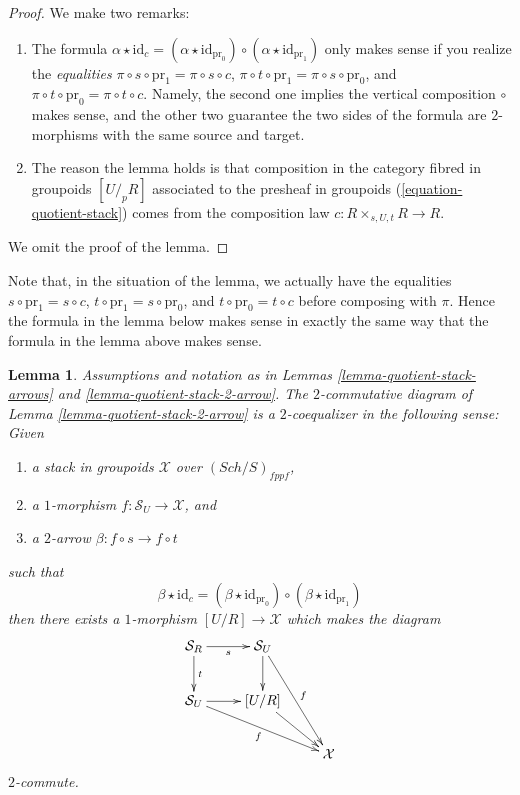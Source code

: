 \documentclass{stacks-project}
\theoremstyle{plain}
\newtheorem{lemma}[subsection]{Lemma}
\theoremstyle{definition}
\theoremstyle{remark}
\numberwithin{equation}{subsection}
\def\Sch{\mathit{Sch}}
\begin{document}
\begin{proof}
We make two remarks:
\begin{enumerate}
\item The formula
$\alpha \star \text{id}_c = (\alpha \star \text{id}_{\text{pr}_0}) \circ
(\alpha \star \text{id}_{\text{pr}_1})$ only makes sense if you realize
the {\it equalities} $\pi \circ s \circ \text{pr}_1 = \pi \circ s \circ c$,
$\pi \circ t \circ \text{pr}_1 = \pi \circ s \circ \text{pr}_0$, and
$\pi \circ t \circ \text{pr}_0 = \pi \circ t \circ c$. Namely, the second
one implies the vertical composition $\circ$ makes sense, and the other
two guarantee the two sides of the formula are $2$-morphisms with the
same source and target.
\item The reason the lemma holds is that composition in the
category fibred in groupoids $[U/_{\!p}R]$ associated to the presheaf
in groupoids (\ref{equation-quotient-stack}) comes from the composition
law $c : R \times_{s, U, t} R \to R$.
\end{enumerate}
We omit the proof of the lemma.
\end{proof}

\noindent
Note that, in the situation of the lemma, we actually have the equalities
$s \circ \text{pr}_1 = s \circ c$,
$t \circ \text{pr}_1 = s \circ \text{pr}_0$, and
$t \circ \text{pr}_0 = t \circ c$ before composing with $\pi$.
Hence the formula in the lemma below makes sense in exactly the same way
that the formula in the lemma above makes sense.

\begin{lemma}
\label{lemma-quotient-stack-2-coequalizer}
Assumptions and notation as in
Lemmas \ref{lemma-quotient-stack-arrows} and
\ref{lemma-quotient-stack-2-arrow}.
The $2$-commutative diagram of Lemma \ref{lemma-quotient-stack-2-arrow}
is a $2$-coequalizer in the following sense:
Given
\begin{enumerate}
\item a stack in groupoids $\mathcal{X}$ over $(\Sch/S)_{fppf}$,
\item a $1$-morphism $f : \mathcal{S}_U \to \mathcal{X}$, and
\item a $2$-arrow $\beta : f \circ s \to f \circ t$
\end{enumerate}
such that
$$
\beta \star \text{id}_c
=
(\beta \star \text{id}_{\text{pr}_0})
\circ
(\beta \star \text{id}_{\text{pr}_1})
$$
then there exists a $1$-morphism $[U/R] \to \mathcal{X}$ which makes the
diagram
$$
\xymatrix{
\mathcal{S}_R \ar[r]_s \ar[d]^t & \mathcal{S}_U \ar[d] \ar[ddr]^f \\
\mathcal{S}_U \ar[r] \ar[rrd]_f & [U/R] \ar[rd] \\
& & \mathcal{X}
}
$$
$2$-commute.
\end{lemma}
\end{document}
